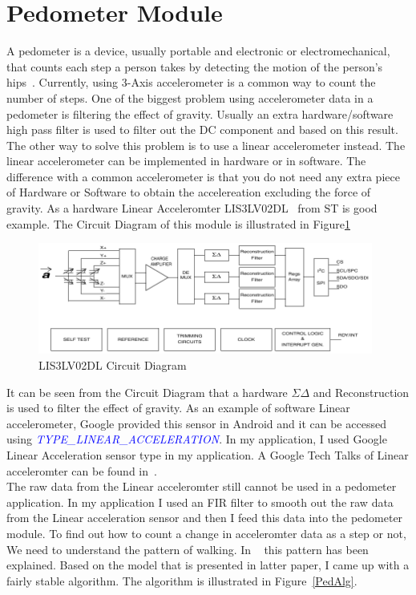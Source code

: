 \documentclass[conference]{IEEEtran}
\begin{document}
\section{Pedometer Module}
A pedometer is a device, usually portable and electronic or electromechanical, that counts each step a person takes by detecting the motion of the person's hips~\cite{PedometerRef}. Currently, using 3-Axis accelerometer is a common way to count the number of steps. One of the biggest problem using accelerometer data in a pedometer is filtering the effect of gravity. Usually an extra hardware/software high pass filter is used to filter out the DC component and based on this result. The other way to solve this problem is to use a linear accelerometer instead. The linear accelerometer can be implemented in hardware or in software. The difference with a common accelerometer is that you do not need any extra piece of Hardware or Software to obtain the accelereation excluding the force of gravity. As a hardware Linear Acceleromter LIS3LV02DL~\cite{STACCEL} from ST is good example. The Circuit Diagram of this module is illustrated in Figure\ref{STACCEL}
\begin{figure}[H]
\centering
\includegraphics[width=11cm]{STLinearAccel.pdf}
\caption{\scriptsize  LIS3LV02DL Circuit Diagram}
\label{STACCEL}
\end{figure}
It can be seen from the Circuit Diagram  that a hardware $\Sigma\Delta$ and Reconstruction is used to filter the effect of gravity. As an example of software Linear accelerometer, Google provided this sensor in Android and it can be accessed using \textcolor{blue}{\emph{TYPE\_LINEAR\_ACCELERATION}}. In my application, I used Google Linear Acceleration sensor type in my application. A Google Tech Talks of Linear acceleromter can be found in~\cite{LinearAccel}.\\
The raw data from the Linear acceleromter still cannot be used in a pedometer application. In my application I used an FIR filter to smooth out the raw data from the Linear acceleration sensor and then I feed this data into the pedometer module.  To find out how to count a change in acceleromter data as a step or not, We need to understand the pattern of walking. In ~\cite{PedPatternRec} this pattern has been explained. Based on the model that is presented in latter paper, I came up with a fairly stable algorithm. The algorithm is illustrated in Figure~\ref{PedAlg}.\\
\end{document}
